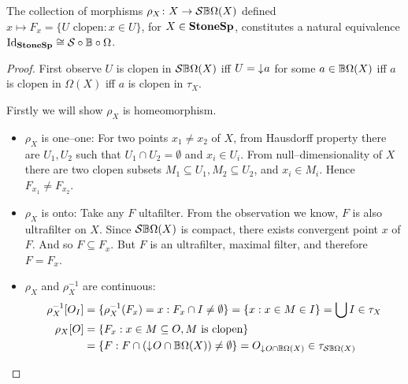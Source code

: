 \begin{proposition}
    The collection of morphisms $\rho_X\colon X \to \mathcal{S}\mathbb{B}\Omega(X)$ defined $x \mapsto F_x = \{U\text{ clopen} : x\in U \}$, for $X \in \mathbf{StoneSp}$, constitutes a natural equivalence $\operatorname{Id}_{\mathbf{StoneSp}} \cong \mathcal{S}\circ\mathbb{B}\circ\Omega$.
\end{proposition}
\begin{proof}
    First observe $U$ is clopen in $\mathcal{S}\mathbb{B}\Omega(X)$ iff $U = \mathord{\downarrow}\mkern1mu a$ for some $a \in \mathbb{B}\Omega(X)$ iff $a$ is clopen in $\Omega(X)$ iff $a$ is clopen in $\tau_X$.

    Firstly we will show $\rho_X$ is homeomorphism.
    \begin{itemize}
        \item $\rho_X$ is one--one: For two points $x_1 \neq x_2$ of $X$, from Hausdorff property there are $U_1, U_2$ such that $U_1\cap U_2 = \emptyset$ and $x_i\in U_i$. From null--dimensionality of $X$ there are two clopen subsets $M_1 \subseteq U_1, M_2 \subseteq U_2$, and $x_i \in M_i$. Hence $F_{x_1} \neq F_{x_2}$.

        \item $\rho_X$ is onto: Take any $F$ ultafilter. From the observation we know, $F$ is also ultrafilter on $X$. Since $\mathcal{S}\mathbb{B}\Omega(X)$ is compact, there exists convergent point $x$ of $F$. And so $F \subseteq F_x$. But $F$ is an ultrafilter, maximal filter, and therefore $F = F_x$.

        \item $\rho_X$ and $\rho_X^{-1}$ are continuous:
        \begin{align*}
            \rho_X^{-1}[O_I] &= \{ \rho_X^{-1}(F_x) = x : F_x \cap I \neq \emptyset\} 
                = \{ x : x \in M \in I \} = \bigcup I \in \tau_X \\
            \rho_X[O] &= \{ F_x : x \in M \subseteq O, M \text{ is clopen}\} \\
                      &= \{ F : F \cap (\mathord{\downarrow}\mkern1mu O \cap \mathbb{B}\Omega(X)) \neq \emptyset\} = O_{\mathord{\downarrow}\mkern1mu O \cap \mathbb{B}\Omega(X)} \in \tau_{\mathcal{S}\mathbb{B}\Omega(X)}
        \end{align*}
    \end{itemize}


\end{proof}

